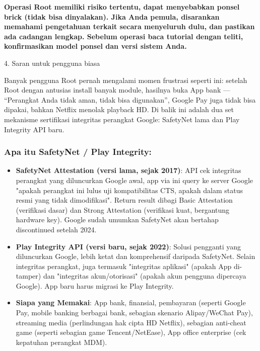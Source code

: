 \textbf{Operasi Root memiliki risiko tertentu, dapat menyebabkan ponsel brick (tidak bisa dinyalakan). Jika Anda pemula, disarankan memahami pengetahuan terkait secara menyeluruh dulu, dan pastikan ada cadangan lengkap. Sebelum operasi baca tutorial dengan teliti, konfirmasikan model ponsel dan versi sistem Anda.}\par

4. Saran untuk pengguna biasa


Banyak pengguna Root pernah mengalami momen frustrasi seperti ini: setelah Root dengan antusias install banyak module, hasilnya buka App bank — “Perangkat Anda tidak aman, tidak bisa digunakan”, Google Pay juga tidak bisa dipakai, bahkan Netflix menolak playback HD. Di balik ini adalah dua set mekanisme sertifikasi integritas perangkat Google: SafetyNet lama dan Play Integrity API baru.

\subsubsection*{Apa itu SafetyNet / Play Integrity:}

\begin{itemize}
  \item \textbf{SafetyNet Attestation (versi lama, sejak 2017)}: API cek integritas perangkat yang diluncurkan Google awal, app via ini query ke server Google "apakah perangkat ini lulus uji kompatibilitas CTS, apakah dalam status resmi yang tidak dimodifikasi". Return result dibagi Basic Attestation (verifikasi dasar) dan Strong Attestation (verifikasi kuat, bergantung hardware key). Google sudah umumkan SafetyNet akan bertahap discontinued setelah 2024.
  \item \textbf{Play Integrity API (versi baru, sejak 2022)}: Solusi pengganti yang diluncurkan Google, lebih ketat dan komprehensif daripada SafetyNet. Selain integritas perangkat, juga termasuk "integritas aplikasi" (apakah App di-tamper) dan "integritas akun/otorisasi" (apakah akun pengguna dipercaya Google). App baru harus migrasi ke Play Integrity.
  \item \textbf{Siapa yang Memakai}: App bank, finansial, pembayaran (seperti Google Pay, mobile banking berbagai bank, sebagian skenario Alipay/WeChat Pay), streaming media (perlindungan hak cipta HD Netflix), sebagian anti-cheat game (seperti sebagian game Tencent/NetEase), App office enterprise (cek kepatuhan perangkat MDM).
\end{itemize}

